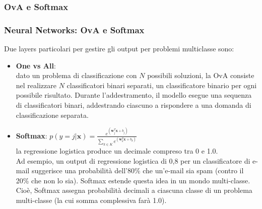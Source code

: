 \subsubsection[OvA e Softmax]{OvA e Softmax}
\begin{frame}

	\frametitle{Neural Networks: OvA e Softmax}

	Due layers particolari per gestire gli output per problemi multiclasse sono:

	\begin{itemize}
		\item \textbf{One vs All}:\\
			dato un problema di classificazione con $N$ possibili soluzioni, la OvA consiste nel realizzare $N$ classificatori binari separati, un classificatore binario per ogni possibile risultato. Durante l'addestramento, il modello esegue una sequenza di classificatori binari, addestrando ciascuno a rispondere a una domanda di classificazione separata.
		\item \textbf{Softmax}: $p(y = j|\textbf{x})  = \frac{e^{(\textbf{w}_j^{T}\textbf{x} + b_j)}}{\sum_{k\in K} {e^{(\textbf{w}_k^{T}\textbf{x} + b_k)}} }$\\
			la regressione logistica produce un decimale compreso tra 0 e 1.0.\\
			Ad esempio, un output di regressione logistica di 0,8 per un classificatore di e-mail suggerisce una probabilità dell'80\% che un'e-mail sia spam (contro il 20\% che non lo sia).
			Softmax estende questa idea in un mondo multi-classe. Cioè, Softmax assegna probabilità decimali a ciascuna classe di un problema multi-classe (la cui somma complessiva farà 1.0).
	\end{itemize}

\end{frame}


